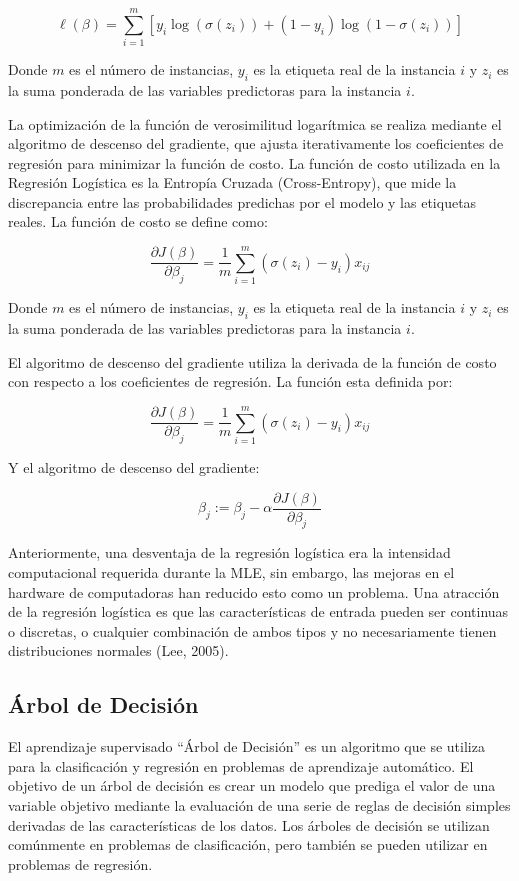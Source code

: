 \documentclass[a4paper,12pt]{article}
\begin{document}
$$ \ell(\beta) = \sum_{i=1}^{m} [y_i \log(\sigma(z_i)) + (1-y_i) \log(1-\sigma(z_i))] $$

Donde $m$ es el número de instancias, $y_i$ es la etiqueta real de la instancia $i$ y $z_i$ es la suma ponderada de las variables predictoras para la instancia $i$.

La optimización de la función de verosimilitud logarítmica se realiza mediante el algoritmo de descenso del gradiente, que ajusta iterativamente los coeficientes de regresión para minimizar la función de costo. La función de costo utilizada en la Regresión Logística es la Entropía Cruzada (Cross-Entropy), que mide la discrepancia entre las probabilidades predichas por el modelo y las etiquetas reales. La función de costo se define como:

$$ \frac{\partial J(\beta)}{\partial \beta_j} = \frac{1}{m} \sum_{i=1}^{m} (\sigma(z_i) - y_i) x_{ij} $$

Donde $m$ es el número de instancias, $y_i$ es la etiqueta real de la instancia $i$ y $z_i$ es la suma ponderada de las variables predictoras para la instancia $i$.

El algoritmo de descenso del gradiente utiliza la derivada de la función de costo con respecto a los coeficientes de regresión. La función esta definida por:

$$ \frac{\partial J(\beta)}{\partial \beta_j} = \frac{1}{m} \sum_{i=1}^{m} (\sigma(z_i) - y_i) x_{ij} $$

Y el algoritmo de descenso del gradiente:

$$ \beta_j := \beta_j - \alpha \frac{\partial J(\beta)}{\partial \beta_j} $$

Anteriormente, una desventaja de la regresión logística era la intensidad computacional requerida durante la MLE, sin embargo, las mejoras en el hardware de computadoras han reducido esto como un problema. Una atracción de la regresión logística es que las características de entrada pueden ser continuas o discretas, o cualquier combinación de ambos tipos y no necesariamente tienen distribuciones normales (Lee, 2005).

\subsection{Árbol de Decisión}

El aprendizaje supervisado ``Árbol de Decisión'' es un algoritmo que se utiliza para la clasificación y regresión en problemas de aprendizaje automático. El objetivo de un árbol de decisión es crear un modelo que prediga el valor de una variable objetivo mediante la evaluación de una serie de reglas de decisión simples derivadas de las características de los datos. Los árboles de decisión se utilizan comúnmente en problemas de clasificación, pero también se pueden utilizar en problemas de regresión.
\end{document}
